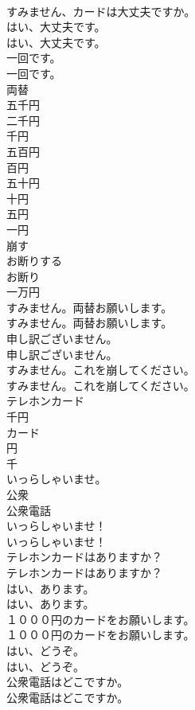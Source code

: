 \documentclass[8pt]{extreport}
\begin{document}
\begin{CJK}{UTF8}{min}
\\	すみません、カードは大丈夫ですか。 
\\	はい、大丈夫です。	
\\	はい、大丈夫です。 
\\	一回です。	
\\	一回です。 
\\	両替
\\	五千円
\\	二千円
\\	千円
\\	五百円
\\	百円
\\	五十円
\\	十円
\\	五円
\\	一円
\\	崩す
\\	お断りする
\\	お断り
\\	一万円
\\	すみません。両替お願いします。	
\\	すみません。両替お願いします。 
\\	申し訳ございません。	
\\	申し訳ございません。 
\\	すみません。これを崩してください。	
\\	すみません。これを崩してください。 
\\	テレホンカード
\\	千円
\\	カード
\\	円
\\	千
\\	いっらしゃいませ。
\\	公衆
\\	公衆電話
\\	いっらしゃいませ！	
\\	いっらしゃいませ！ 
\\	テレホンカードはありますか？	
\\	テレホンカードはありますか？ 
\\	はい、あります。	
\\	はい、あります。 
\\	１０００円のカードをお願いします。	
\\	１０００円のカードをお願いします。 
\\	はい、どうぞ。	
\\	はい、どうぞ。 
\\	公衆電話はどこですか。	
\\	公衆電話はどこですか。 

\end{CJK}
\end{document}
